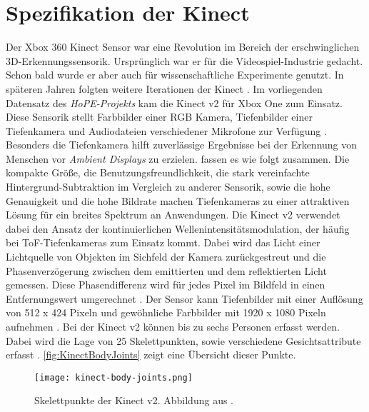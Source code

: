 \section{Spezifikation der Kinect}
\label{2-SpezifikationKinect}
Der Xbox 360 Kinect Sensor war eine Revolution im Bereich der erschwinglichen 3D-Erkennungssensorik.
Ursprünglich war er für die Videospiel-Industrie gedacht.
Schon bald wurde er aber auch für wissenschaftliche Experimente genutzt.
In späteren Jahren folgten weitere Iterationen der Kinect \citep{tolgyessy_evaluation_2021}.
Im vorliegenden Datensatz des \emph{HoPE-Projekts} kam die Kinect v2 für Xbox One zum Einsatz.
Diese Sensorik stellt Farbbilder einer \ac{RGB} Kamera, Tiefenbilder einer Tiefenkamera
und Audiodateien verschiedener Mikrofone zur Verfügung \citep{windows-developer-center_microsoft_corporation_human_2014}.
Besonders die Tiefenkamera hilft zuverlässige Ergebnisse bei der Erkennung von Menschen vor \emph{Ambient Displays} zu erzielen.
\citet{li_time-flight_2014} fassen es wie folgt zusammen.
Die kompakte Größe, die Benutzungsfreundlichkeit,
die stark vereinfachte Hintergrund-Subtraktion im Vergleich zu anderer Sensorik, sowie die hohe Genauigkeit
und die hohe Bildrate machen Tiefenkameras zu einer attraktiven Lösung für ein breites Spektrum an Anwendungen.
Die Kinect v2 verwendet dabei den Ansatz der kontinuierlichen Wellenintensitätsmodulation,
der häufig bei \ac{ToF}-Tiefenkameras zum Einsatz kommt.
Dabei wird das Licht einer Lichtquelle von Objekten im Sichfeld der Kamera zurückgestreut
und die Phasenverzögerung zwischen dem emittierten und dem reflektierten Licht gemessen.
Diese Phasendifferenz wird für jedes Pixel im Bildfeld in einen Entfernungswert umgerechnet \citep{tolgyessy_evaluation_2021}.
Der Sensor kann Tiefenbilder mit einer Auflösung von 512 x 424 Pixeln
und gewöhnliche Farbbilder mit 1920 x 1080 Pixeln aufnehmen \citep{marin_multi-camera_2019}.
Bei der Kinect v2 können bis zu sechs Personen erfasst werden.
Dabei wird die Lage von 25 Skelettpunkten, sowie verschiedene Gesichtsattribute erfasst \citep{windows-developer-center_microsoft_corporation_human_2014}.
\autoref{fig:KinectBodyJoints} zeigt eine Übersicht dieser Punkte. 

\begin{figure}[ht]
  \begin{center}
  \texttt{[image: kinect-body-joints.png]}
  \end{center}
  \caption{Skelettpunkte der Kinect v2. Abbildung aus \citet{windows-developer-center_microsoft_corporation_human_2014}.}
  \label{fig:KinectBodyJoints}
\end{figure}


